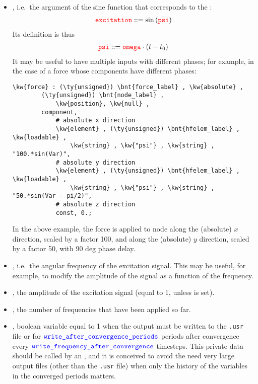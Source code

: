 \begin{itemize}
\item {}, i.e.\ the argument of the sine function that corresponds to the :
\begin{align}
	\textcolor{red}{\texttt{excitation}} ::= \sin\left( \textcolor{red}{\texttt{psi}} \right)
\end{align}
Its definition is thus
\begin{align}
	\textcolor{red}{\texttt{psi}} ::= \textcolor{red}{\texttt{omega}} \cdot (t - t_0)
\end{align}
It may be useful to have multiple inputs with different phases; for example, in the case of a force whose components have different phases:
\begin{Verbatim}[commandchars=\\\{\}]
    \kw{force} : (\ty{unsigned}) \bnt{force_label} , \kw{absolute} ,
        (\ty{unsigned}) \bnt{node_label} ,
            \kw{position}, \kw{null} ,
        component,
            # absolute x direction
            \kw{element} , (\ty{unsigned}) \bnt{hfelem_label} , \kw{loadable} ,
                \kw{string} , \kw{"psi"} , \kw{string} , "100.*sin(Var)",
            # absolute y direction
            \kw{element} , (\ty{unsigned}) \bnt{hfelem_label} , \kw{loadable} ,
                \kw{string} , \kw{"psi"} , \kw{string} , "50.*sin(Var - pi/2)",
            # absolute z direction
            const, 0.;
\end{Verbatim}
In the above example, the force is applied to node 
along the (absolute) $x$ direction, scaled by a factor 100, and
along the (absolute) $y$ direction, scaled by a factor 50, with 90 deg phase delay.

\item {}, i.e.\ the angular frequency of the excitation signal.
This may be useful, for example, to modify the amplitude of the signal as a function of the frequency.

\item {}, the amplitude of the excitation signal (equal to 1, unless  is set).

\item {}, the number of frequencies that have been applied so far.

\item {}, boolean variable equal to 1 when the output must be written to the \texttt{.usr} file or for $\textcolor{blue}{\texttt{write\_after\_convergence\_periods}}$ periods after convergence every $\textcolor{blue}{\texttt{write\_frequency\_after\_convergence}}$ timesteps. This private data should be called by an , and it is conceived to avoid the need very large output files (other than the \texttt{.usr} file) when only the history of the variables in the converged periods matters.


\end{itemize}
